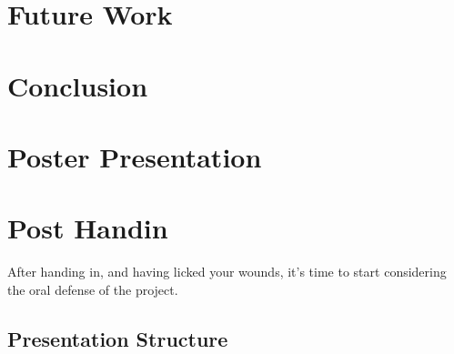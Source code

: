 \documentclass[a4paper, oneside]{memoir}
\begin{document}
\chapter{Future Work}

\chapter{Conclusion}

\chapter{Poster Presentation}

\chapter{Post Handin}

After handing in, and having licked your wounds, it's time to start considering the oral defense of the project.


\section{Presentation Structure}
\end{document}
